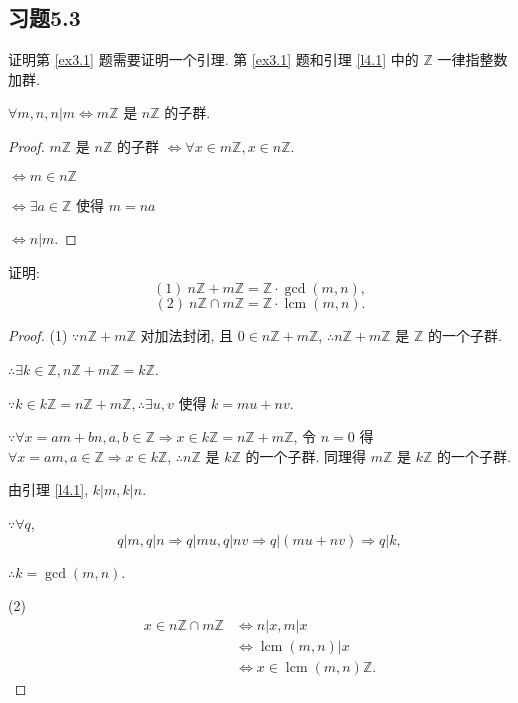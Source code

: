 \documentclass[UTF8]{ctexart}
\begin{document}
\subsection{习题5.3}
证明第 \ref{ex3.1} 题需要证明一个引理. 第 \ref{ex3.1} 题和引理 \ref{l4.1} 中的 $\mathbb{Z}$ 一律指整数加群.
\begin{lemma}\label{l4.1}
    $\forall m,n,n|m\Leftrightarrow m\mathbb{Z}$ 是 $n\mathbb{Z}$ 的子群.
\end{lemma}
\begin{proof}
    $m\mathbb{Z}$ 是 $n\mathbb{Z}$ 的子群 $\Leftrightarrow\forall x\in m\mathbb{Z},x\in n\mathbb{Z}$.

    $\Leftrightarrow m\in n\mathbb{Z}$

    $\Leftrightarrow\exists a\in\mathbb{Z}$ 使得 $m=na$

    $\Leftrightarrow n|m$.
\end{proof}
\begin{exercise}[3.1]\label{ex3.1}
    证明:
    \[(1)\ n\mathbb{Z}+m\mathbb{Z}=\mathbb{Z}\cdot\gcd(m,n),\]
    \[(2)\ n\mathbb{Z}\cap m\mathbb{Z}=\mathbb{Z}\cdot\operatorname{lcm}(m,n).\]
\end{exercise}
\begin{proof}
    (1) $\because n\mathbb{Z}+m\mathbb{Z}$ 对加法封闭, 且 $0\in n\mathbb{Z}+m\mathbb{Z}$, $\therefore n\mathbb{Z}+m\mathbb{Z}$ 是 $\mathbb{Z}$ 的一个子群.
    
    $\therefore\exists k\in\mathbb{Z},n\mathbb{Z}+m\mathbb{Z}=k\mathbb{Z}$.

    $\because k\in k\mathbb{Z}=n\mathbb{Z}+m\mathbb{Z},\therefore\exists u,v$ 使得 $k=mu+nv$.

    $\because\forall x=am+bn,a,b\in\mathbb{Z}\Rightarrow x\in k\mathbb{Z}=n\mathbb{Z}+m\mathbb{Z}$, 令 $n=0$ 得 $\forall x=am,a\in\mathbb{Z}\Rightarrow x\in k\mathbb{Z}$, $\therefore n\mathbb{Z}$ 是 $k\mathbb{Z}$ 的一个子群. 同理得 $m\mathbb{Z}$ 是 $k\mathbb{Z}$ 的一个子群.

    由引理 \ref{l4.1}, $k|m,k|n$.

    $\because\forall q$,
    \[q|m,q|n\Rightarrow q|mu,q|nv\Rightarrow q|(mu+nv)\Rightarrow q|k,\]

    $\therefore k=\gcd(m,n)$.

    (2)
    \begin{align*}
        x\in n\mathbb{Z}\cap m\mathbb{Z} & \Leftrightarrow n|x,m|x \\
        & \Leftrightarrow\operatorname{lcm}(m,n)|x \\
        & \Leftrightarrow x\in\operatorname{lcm}(m,n)\mathbb{Z}.
    \end{align*}
\end{proof}
\end{document}

